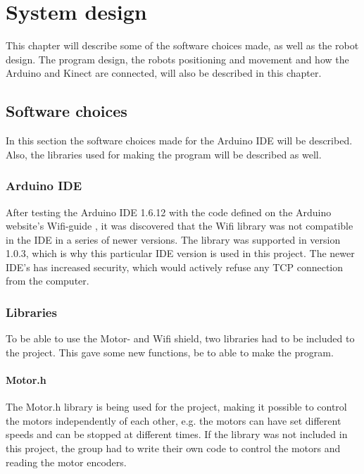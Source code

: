 \chapter{System design}
\label{chap:System design}
This chapter will describe some of the software choices made, as well as the robot design. The program design, the robots positioning and movement and how the Arduino and Kinect are connected, will also be described in this chapter. 

\section{Software choices}
\label{sec:Software choices}
In this section the software choices made for the Arduino IDE will be described. Also, the libraries used for making the program will be described as well. 

\subsection{Arduino IDE}
\label{sec:Arduino IDE}
After testing the Arduino IDE 1.6.12 with the code defined on the Arduino website's Wifi-guide \citep{wg}, it was discovered that the Wifi library was not compatible in the IDE in a series of newer versions. The library was supported in version 1.0.3, which is why this particular IDE version is used in this project. The newer IDE's has increased security, which would actively refuse any TCP connection from the computer.

\subsection{Libraries}
\label{sec:Libraries}
To be able to use the Motor- and Wifi shield, two libraries had to be included to the project. This gave some new functions, be to able to make the program. 

\subsubsection{Motor.h}
\label{sec:Motor.h}
The Motor.h library is being used for the project, making it possible to control the motors independently of each other, e.g. the motors can have set different speeds and can be stopped at different times. If the library was not included in this project, the group had to write their own code to control the motors and reading the motor encoders. 


